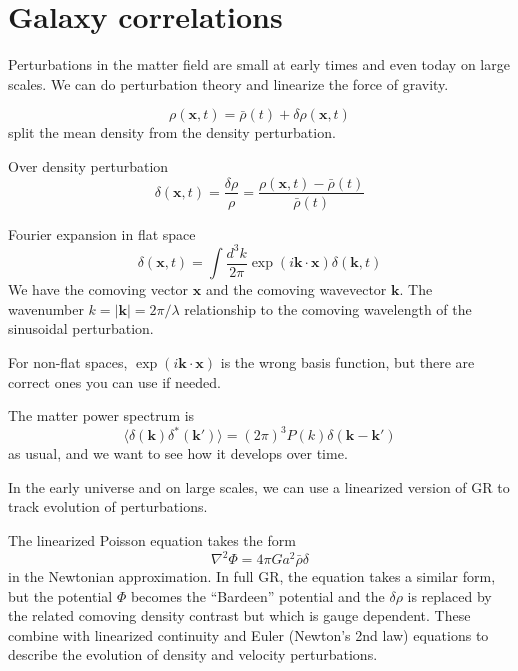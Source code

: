 \chapter{Galaxy correlations} \label{ch:galaxy_correlations}

Perturbations in the matter field are small at early times and even today on large scales.  We can do perturbation theory and linearize the force of gravity.

\begin{equation}
\rho(\mathbf{x},t) = \bar \rho(t) + \delta \rho   (\mathbf{x},t)
\end{equation}
split the mean density from the density perturbation.

Over density perturbation
\begin{equation}
  \delta(\mathbf{x},t) = \frac{\delta \rho}{\rho} = \frac{\rho(\mathbf{x},t) - \bar \rho(t)}{\bar \rho(t)}
\end{equation}

Fourier expansion in flat space
\begin{equation}
\delta(\mathbf{x},t) = \int \frac{d^3k}{2\pi} \exp(i \mathbf{k \cdot x}) \delta(\mathbf{k},t) 
\end{equation}
We have the comoving vector $\mathbf{x}$ and the comoving wavevector  $\mathbf{k}$.  The wavenumber $k = | \mathbf{k} | = 2\pi/\lambda $ relationship to the comoving wavelength of the sinusoidal perturbation.

For non-flat spaces, $\exp(i \mathbf{k \cdot x})$ is the wrong basis function, but there are correct ones you can use if needed.

The matter power spectrum is
\begin{equation}
\langle  \delta(\mathbf{k}) \delta^*(\mathbf{k'}) \rangle = (2\pi)^3 P(k) \delta(\mathbf{k-k'})
\end{equation}
as usual, and we want to see how it develops over time.

In the early universe and on large scales, we can use a linearized version of GR to track evolution of perturbations.

The linearized Poisson equation takes the form
\begin{equation}
  \nabla^2 \Phi = 4\pi G a^2 \bar\rho \delta
\end{equation}
in the Newtonian approximation.  In full GR, the equation takes a similar form, but the potential $\Phi$ becomes the ``Bardeen'' potential and the $\delta \rho$ is replaced by the related comoving density contrast but which is gauge dependent.  These combine with linearized continuity and Euler (Newton's 2nd law) equations to describe the evolution of density and velocity perturbations.

